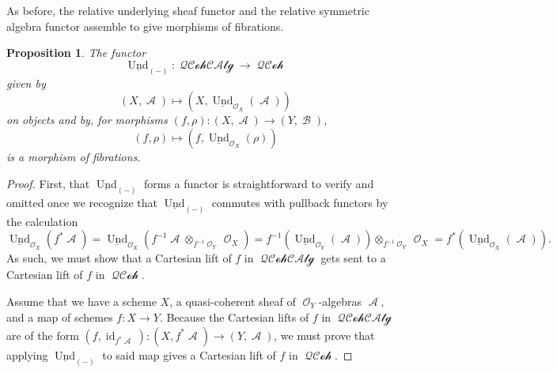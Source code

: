 \documentclass{amsart}
\newtheorem{proposition}[equation]{Proposition}
\theoremstyle{definition}
\DeclareMathOperator{\Ascr}{\mathscr{A}}
\DeclareMathOperator{\Bscr}{\mathscr{B}}
\DeclareMathOperator{\Ocal}{\mathcal{O}}
\DeclareMathOperator{\id}{id}
\DeclareMathOperator{\und}{Und}
\newcommand{\RelUnd}[1]{\underline{\und}_{{#1}}}
\DeclareMathOperator{\QQCoh}{\mathcal{QCoh}}
\DeclareMathOperator{\QQCAlg}{\mathcal{QCohCAlg}}
\numberwithin{equation}{subsection}
\begin{document}
As before, the relative underlying sheaf functor and the relative symmetric algebra functor assemble to give morphisms of fibrations.
\begin{proposition}\label{Prop: Section Background Scheme: Rel Und is Fibration Map}
	The functor
	\[
	\RelUnd{(-)}:\QQCAlg \to \QQCoh
	\]
	given by
	\[
	(X,\Ascr) \mapsto \left(X,\RelUnd{\Ocal_X}(\Ascr)\right)
	\]
	on objects and by, for morphisms $(f,\rho):(X,\Ascr) \to (Y,\Bscr)$,
	\[
	(f,\rho) \mapsto (f, \RelUnd{\Ocal_X}(\rho))
	\]
	is a morphism of fibrations.
\end{proposition}
\begin{proof}
	First, that $\RelUnd{(-)}$ forms a functor is straightforward to verify and omitted once we recognize that $\RelUnd{(-)}$ commutes with pullback functors by the calculation
	\[
	\RelUnd{\Ocal_X}(f^{\ast}\Ascr) = \RelUnd{\Ocal_X}\!\left(f^{-1}\!\Ascr \otimes_{f^{-1}\Ocal_Y} \Ocal_X\right) = f^{-1}\!\left(\RelUnd{\Ocal_Y}\!(\Ascr)\right) \otimes_{f^{-1}\Ocal_Y} \Ocal_X =  f^{\ast}\left(\RelUnd{\Ocal_X}(\Ascr)\right).
	\]
	As such, we must show that a Cartesian lift of $f$ in $\QQCAlg$ gets sent to a Cartesian lift of $f$ in $\QQCoh$.
	
	Assume that we have a scheme $X$, a quasi-coherent sheaf of $\Ocal_Y$-algebras $\Ascr$, and a map of schemes $f:X \to Y$.  Because the Cartesian lifts of $f$ in $\QQCAlg$ are of the form $(f,\id_{f^{\ast}\Ascr}):(X,f^{\ast}\Ascr) \to (Y,\Ascr)$, we must prove that applying $\RelUnd{(-)}$ to said map gives a Cartesian lift of $f$ in $\QQCoh$.
	

\end{proof}
\end{document}

